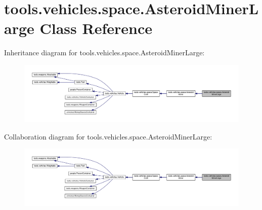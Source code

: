 \hypertarget{classtools_1_1vehicles_1_1space_1_1_asteroid_miner_large}{}\section{tools.\+vehicles.\+space.\+Asteroid\+Miner\+Large Class Reference}
\label{classtools_1_1vehicles_1_1space_1_1_asteroid_miner_large}


Inheritance diagram for tools.\+vehicles.\+space.\+Asteroid\+Miner\+Large\+:
\nopagebreak
\begin{figure}[H]
\begin{center}
\leavevmode
\includegraphics[width=350pt]{classtools_1_1vehicles_1_1space_1_1_asteroid_miner_large__inherit__graph}
\end{center}
\end{figure}


Collaboration diagram for tools.\+vehicles.\+space.\+Asteroid\+Miner\+Large\+:
\nopagebreak
\begin{figure}[H]
\begin{center}
\leavevmode
\includegraphics[width=350pt]{classtools_1_1vehicles_1_1space_1_1_asteroid_miner_large__coll__graph}
\end{center}
\end{figure}
